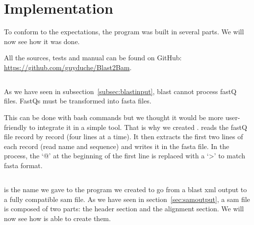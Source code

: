 \chapter{Implementation}
To conform to the expectations, the program was built in several parts.
We will now see how it was done.

All the sources, tests and manual can be found on GitHub: \url{https://github.com/guyduche/Blast2Bam}.


\section{\fastqtofasta{}}
\label{sec:fastq2fasta}
As we have seen in subsection~\ref{subsec:blastinput}, \gls{blast} cannot process fastQ files.
FastQs must be transformed into fasta files.

This can be done with bash commands but we thought it would be more user-friendly to integrate it in a simple tool.
That is why we created \fastqtofasta{}.
\fastqtofasta{} reads the fastQ file record by record (four lines at a time).
It then extracts the first two lines of each record (read name and sequence) and writes it in the fasta file.
In the process, the `@' at the beginning of the first line is replaced with a `\textgreater' to match fasta format.


\section{\blastobam{}}
\blastobam{} is the name we gave to the program we created to go from a \gls{blast} \gls{xml} output to a fully compatible \gls{sam} file.
As we have seen in section~\ref{sec:samoutput}, a \gls{sam} file is composed of two parts: the header section and the alignment section.
We will now see how \blastobam{} is able to create them.


